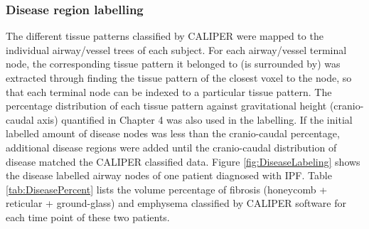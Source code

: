 \subsubsection{Disease region labelling}
The different tissue patterns classified by CALIPER were mapped to the individual airway/vessel trees of each subject. For each airway/vessel terminal node, the corresponding tissue pattern it belonged to (is surrounded by) was extracted through finding the tissue pattern of the closest voxel to the node, so that each terminal node can be indexed to a particular tissue pattern. The percentage distribution of each tissue pattern against gravitational height (cranio-caudal axis) quantified in Chapter 4 was also used in the labelling. If the initial labelled amount of disease nodes was less than the cranio-caudal percentage, additional disease regions were added until the cranio-caudal distribution of disease matched the CALIPER classified data. Figure \ref{fig:DiseaseLabeling} shows the disease labelled airway nodes of one patient diagnosed with IPF. Table \ref{tab:DiseasePercent} lists the volume percentage of fibrosis (honeycomb + reticular + ground-glass) and emphysema classified by CALIPER software for each time point of these two patients.

